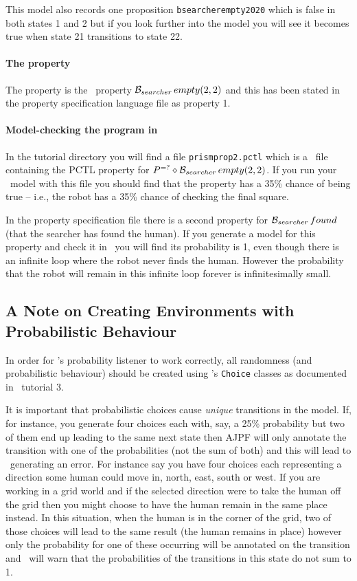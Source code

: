 \documentclass[a4]{article}
\begin{document}
This model also records one proposition \texttt{bsearcherempty2020} which is false in both states 1 and 2 but if you look further into the model you will see it becomes true when state 21 transitions to state 22.

\paragraph{The property} The property is the \ajpf\ property $\mathrm{{\cal B}}_{searcher} \, empty(2, 2)$ and this has been stated in the property specification language file as property 1. 

\paragraph{Model-checking the program in \prism}  In the tutorial directory you will find a file \texttt{prismprop2.pctl} which is a \prism\ file containing the PCTL property for $P^{=?}\diamond \mathrm{{\cal B}}_{searcher} \, empty(2, 2)$.  If you run your \prism\ model with this file you should find that the property has a 35\% chance of being true -- i.e., the robot has a 35\% chance of checking the final square.

In the property specification file there is a second property for $\mathrm{{\cal B}}_{searcher} \, found$ (that the searcher has found the human).  If you generate a model for this property and check it in \prism\ you will find its probability is 1, even though there is an infinite loop where the robot never finds the human.   However the probability that the robot will remain in this infinite loop forever is infinitesimally small.

\subsection{A Note on Creating Environments with Probabilistic Behaviour}

In order for \ajpf's probability listener to work correctly, all randomness (and probabilistic behaviour) should be created using \ail's \texttt{Choice} classes as documented in \ail\ tutorial 3.  

It is important that probabilistic choices cause \emph{unique} transitions in the model.  If, for instance, you generate four choices each with, say, a 25\% probability but two of them end up leading to the same next state then AJPF will only annotate the transition with one of the probabilities (not the sum of both) and this will lead to \prism\ generating an error.  For instance say you have four choices each representing a direction some human could move in, north, east, south or west.  If you are working in a grid world and if the selected direction were to take the human off the grid then you might choose to have the human remain in the same place instead.  In this situation, when the human is in the corner of the grid, two of those choices will lead to the same result (the human remains in place) however only the probability for one of these occurring will be annotated on the transition and \prism\ will warn that the probabilities of the transitions in this state do not sum to 1.
\end{document}
